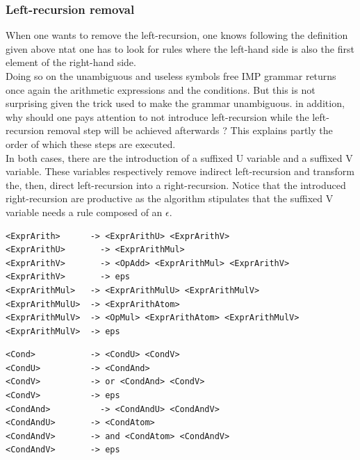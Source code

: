 \documentclass[a4paper,11pt]{article}
\begin{document}
    \subsubsection{Left-recursion removal}
      When one wants to remove the left-recursion, one knows following the definition given above ntat one has to look for rules where the left-hand side is also the first element of the right-hand side.\\
      Doing so on the unambiguous and useless symbols free IMP grammar returns once again the arithmetic expressions and the conditions. But this is not surprising given the trick used to make the grammar unambiguous. in addition, why should one pays attention to not introduce left-recursion while the left-recursion removal step will be achieved afterwards ? This explains partly the order of which these steps are executed.\\
      In both cases, there are the introduction of a suffixed U variable and a suffixed V variable. These variables respectively remove indirect left-recursion and transform the, then, direct left-recursion into a right-recursion. Notice that the introduced right-recursion are productive as the algorithm stipulates that the suffixed V variable needs a rule composed of an $\epsilon$.
      \begin{lstlisting}
<ExprArith>	     -> <ExprArithU> <ExprArithV>
<ExprArithU>	   -> <ExprArithMul>
<ExprArithV>	   -> <OpAdd> <ExprArithMul> <ExprArithV> 
<ExprArithV>	   -> eps
<ExprArithMul>	 -> <ExprArithMulU> <ExprArithMulV>
<ExprArithMulU>	 -> <ExprArithAtom> 
<ExprArithMulV>	 -> <OpMul> <ExprArithAtom> <ExprArithMulV> 
<ExprArithMulV>	 -> eps\end{lstlisting}
      \begin{lstlisting} 
<Cond>	         -> <CondU> <CondV>
<CondU>	         -> <CondAnd> 
<CondV>	         -> or <CondAnd> <CondV> 
<CondV>	         -> eps
<CondAnd>	       -> <CondAndU> <CondAndV>
<CondAndU>	     -> <CondAtom> 
<CondAndV>	     -> and <CondAtom> <CondAndV> 
<CondAndV>	     -> eps\end{lstlisting}
\end{document}
